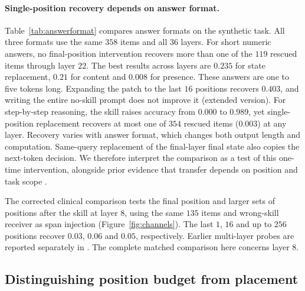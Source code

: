 \paragraph{Single-position recovery depends on answer format.}
\label{sec:onepos}
Table~\ref{tab:answerformat} compares answer formats on the synthetic task.
All three formats use the same $358$ items and all $36$ layers. For short
numeric answers, no final-position intervention recovers more than one of the
$119$ rescued items through layer $22$. The best results across layers are
$0.235$ for state replacement, $0.21$ for content and $0.008$ for presence.
These answers are one to five tokens long. Expanding the patch to the last
$16$ positions recovers $0.403$, and writing the entire no-skill prompt does
not improve it (extended version).
For step-by-step reasoning, the skill raises accuracy from $0.000$ to
$0.989$, yet single-position replacement recovers at most one of $354$ rescued
items ($0.003$) at any layer.
Recovery varies with answer format, which changes both output length and
computation. Same-query replacement of the final-layer final state also
copies the next-token decision. We therefore interpret the comparison as a
test of this one-time intervention, alongside prior evidence that transfer
depends on position and task scope \citep{jit2025taskrepr}.

\begin{table}[tbp]
\caption{Final-position state replacement across answer formats, Qwen3-8B.
All formats use the same $358$ items and the same skill, with every layer
($0$--$35$) tested. Recovery is the best state-replacement result over layers
on each format's rescued items. The identity intervention reproduces the
unpatched output on every item and layer.}
\label{tab:answerformat}
\centering\small

\end{table}

The corrected clinical comparison tests the final position and larger sets
of positions after the skill at layer $8$, using the same $135$ items and
wrong-skill receiver as span injection (Figure~\ref{fig:channels}). The last
$1$, $16$ and up to $256$ positions recover $0.03$, $0.06$ and $0.05$,
respectively. Earlier multi-layer probes
are reported separately in . The complete matched
comparison here concerns layer $8$.


\subsection{Distinguishing position budget from placement}
\label{sec:posbudget}


